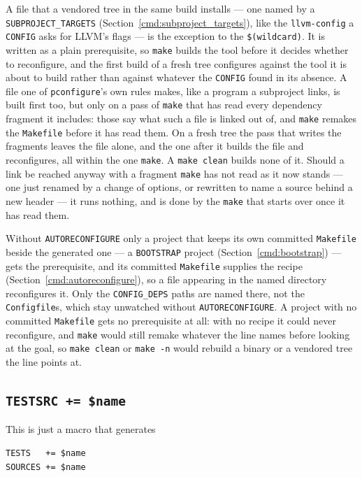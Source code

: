 \documentclass{article}
\newcommand{\pconfigure}{\texttt{pconfigure}}
\begin{document}
A file that a vendored tree in the same build installs --- one named
by a \texttt{SUBPROJECT\_TARGETS} (Section~\ref{cmd:subproject_targets}),
like the \texttt{llvm-config} a \texttt{CONFIG} asks for LLVM's flags
--- is the exception to the \texttt{\$(wildcard)}.  It is written as a
plain prerequisite, so \texttt{make} builds the tool before it decides
whether to reconfigure, and the first build of a fresh tree configures
against the tool it is about to build rather than against whatever the
\texttt{CONFIG} found in its absence.  A file one of \pconfigure's own
rules makes, like a program a subproject links, is built first too,
but only on a pass of \texttt{make} that has read every dependency
fragment it includes: those say what such a file is linked out of, and
\texttt{make} remakes the \texttt{Makefile} before it has read them.
On a fresh tree the pass that writes the fragments leaves the file
alone, and the one after it builds the file and reconfigures, all
within the one \texttt{make}.  A \texttt{make clean} builds none of
it.  Should a link be reached anyway with a fragment \texttt{make} has
not read as it now stands --- one just renamed by a change of options,
or rewritten to name a source behind a new header --- it runs nothing,
and is done by the \texttt{make} that starts over once it has read
them.

Without \texttt{AUTORECONFIGURE} only a project that keeps its own
committed \texttt{Makefile} beside the generated one --- a
\texttt{BOOTSTRAP} project (Section~\ref{cmd:bootstrap}) --- gets the
prerequisite, and its committed \texttt{Makefile} supplies the recipe
(Section~\ref{cmd:autoreconfigure}), so a file appearing in the named
directory reconfigures it.  Only the \texttt{CONFIG\_DEPS} paths are
named there, not the \texttt{Configfile}s, which stay unwatched without
\texttt{AUTORECONFIGURE}.  A project with no committed \texttt{Makefile}
gets no prerequisite at all: with no recipe it could never reconfigure,
and \texttt{make} would still remake whatever the line names before
looking at the goal, so \texttt{make clean} or \texttt{make -n} would
rebuild a binary or a vendored tree the line points at.

\subsection{\texttt{TESTSRC += \$name} \label{cmd:testsrc}}

This is just a macro that generates
\begin{verbatim}
TESTS   += $name
SOURCES += $name
\end{verbatim}
\end{document}
